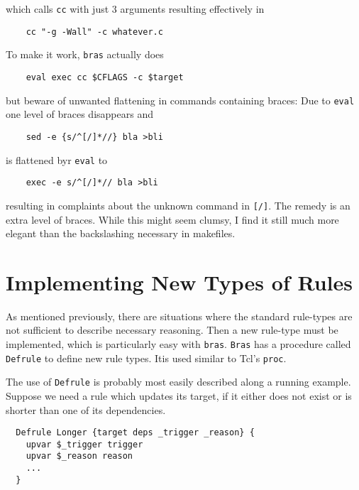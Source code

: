 \documentclass[12pt]{article}
\newcommand{\bras}{\texttt{bras}}
\newcommand{\Bras}{\texttt{Bras}}
\begin{document}
which calls \texttt{cc} with just 3 arguments resulting effectively in

\begin{verbatim}
    cc "-g -Wall" -c whatever.c
\end{verbatim}

To make it work, \bras{} actually does

\begin{verbatim}
    eval exec cc $CFLAGS -c $target
\end{verbatim}

but beware of unwanted flattening in commands containing braces: Due
to \texttt{eval} one level of braces
disappears and

\begin{verbatim}
    sed -e {s/^[/]*//} bla >bli
\end{verbatim}

is flattened byr \texttt{eval} to

\begin{verbatim}
    exec -e s/^[/]*// bla >bli
\end{verbatim}

resulting in complaints about the unknown command in
\texttt{[/]}. The remedy is an extra level of braces. While this might
seem clumsy, I find it still much more elegant than the backslashing
necessary in makefiles.


\section{Implementing New Types of Rules}
\label{secNewRules}
As mentioned previously, there are situations where the standard
rule-types are not sufficient to describe necessary reasoning. Then a
new rule-type must be implemented, which is particularly easy with
\bras{}. \Bras{} has a procedure called
\texttt{Defrule} to define new rule types. Itis used similar to Tcl's
\texttt{proc}.

The use of \texttt{Defrule} is probably most easily described along a
running example. Suppose we need a rule which updates its target, if
it either does not exist or is shorter than one of its dependencies.

\begin{verbatim}
  Defrule Longer {target deps _trigger _reason} {
    upvar $_trigger trigger
    upvar $_reason reason
    ...
  }
\end{verbatim}
\end{document}
